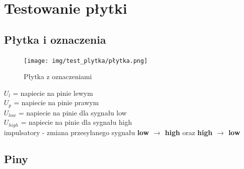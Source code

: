 \chapter{Testowanie płytki}

\section{Płytka i oznaczenia}

\begin{figure}[H]
    \centering
    \texttt{[image: img/test\_plytka/płytka.png]}
    \caption{Płytka z oznaczeniami}
    \label{fig:plytka_z_oznaczeniami}
\end{figure}

\begin{center}
    $U_l$ = napiecie na pinie lewym \\
    $U_p$ = napiecie na pinie prawym \\
    $U_{low}$ = napiecie na pinie dla sygnału low \\
    $U_{high}$ = napiecie na pinie dla sygnału high \\
    impulsatory - zmiana przesyłanego sygnału \textbf{low $\xrightarrow{}$ high} oraz \textbf{high $\xrightarrow{}$ low}
\end{center}

\section{Piny}

